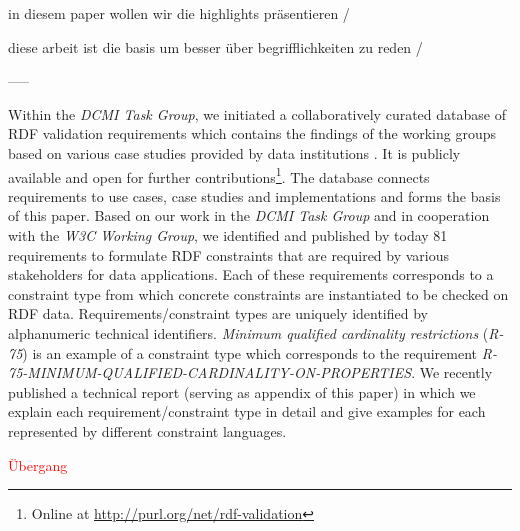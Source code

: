 \documentclass{acm_proc_article-sp}
\begin{document}
in diesem paper wollen wir die highlights präsentieren / 

diese arbeit ist die basis um besser über begrifflichkeiten zu reden /

-----

Within the \emph{DCMI Task Group}, we initiated a collaboratively curated database of RDF validation requirements which contains the findings of the working groups based on various case studies provided by data institutions \cite{BoschEckert2014}. It is publicly available and open for further contributions\footnote{Online at \url{http://purl.org/net/rdf-validation}}.
The database connects requirements to use cases, case studies and implementations and forms the basis of this paper. 
Based on our work in the \emph{DCMI Task Group} and in cooperation with the \emph{W3C Working Group}, 
we identified and published by today 81 requirements to formulate RDF constraints that are required by various stakeholders for data applications.
Each of these requirements corresponds to a constraint type from which concrete constraints are instantiated to be checked on RDF data.
Requirements/constraint types are uniquely identified by alphanumeric technical identifiers.
\emph{Minimum qualified cardinality restrictions} (\emph{R-75}) is an example of a constraint type which corresponds to the requirement {\small\emph{R-75-MINIMUM-QUALIFIED-CARDINALITY-ON-PROPERTIES}}. 
We recently published a technical report \cite{BoschNolleAcarEckert2015}
(serving as appendix of this paper) 
in which we explain each requirement/constraint type in detail and give examples for each represented by different constraint languages.


\textcolor{red}{Übergang}
\end{document}
